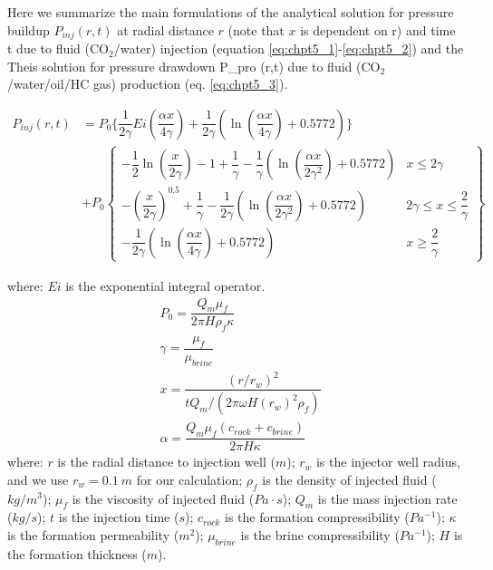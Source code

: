 Here we summarize the main formulations of the analytical solution for pressure buildup $P_{inj}(r,t)$  at radial distance $r$ (note that $x$ is dependent on r) and time t due to fluid (CO$_{2}$/water) injection  \cite[]{mathias2009approximate} (equation \ref{eq:chpt5_1}-\ref{eq:chpt5_2}) and the Theis solution for pressure drawdown P\_pro (r,t) due to fluid (CO$_{2}$/water/oil/HC gas) production (eq. \ref{eq:chpt5_3}).

\begin{equation} \label{eq:chpt5_1}
\begin{aligned}
P_{inj}(r,t) & = P_{0}\{\dfrac{1}{2\gamma}Ei(\dfrac{\alpha x}{4\gamma})+\dfrac{1}{2\gamma}(\ln(\dfrac{\alpha x}{4\gamma})+0.5772)\} \\
& + P_{0}
\left\lbrace
  \begin{array}{lr}
  -\dfrac{1}{2}\ln(\dfrac{x}{2\gamma})-1 + \dfrac{1}{\gamma} - \dfrac{1}{\gamma}(\ln(\dfrac{\alpha x}{2\gamma^2})+0.5772) & x\leq 2\gamma \\
  -(\dfrac{x}{2\gamma})^{0.5} + \dfrac{1}{\gamma} - \dfrac{1}{2\gamma}(\ln(\dfrac{\alpha x}{2\gamma^2})+0.5772) & 2\gamma \leq x\leq \dfrac{2}{\gamma} \\
  -\dfrac{1}{2\gamma}(\ln(\dfrac{\alpha x}{4\gamma})+0.5772) & x\geq \dfrac{2}{\gamma} 
  \end{array}
\right\rbrace 
\end{aligned} 
\end{equation} 

where:
$Ei$ is the exponential integral operator.
\begin{equation} \label{eq:chpt5_2}
\begin{aligned}
& P_{0} = \dfrac{Q_m\mu_f}{2\pi H \rho_{f} \kappa} \\
& \gamma = \dfrac{\mu_{f}}{\mu_{brine}} \\
& x = \dfrac{(r/r_w)^2}{tQ_m/(2\pi\omega H(r_w)^2 \rho_f)} \\
& \alpha = \dfrac{Q_m \mu_f (c_{rock}+c_{brine})}{2\pi H \kappa}
\end{aligned}
\end{equation}
where: 
$r$ is the radial distance to injection well ($m$); $r_w$ is the injector well radius, and we use $r_w = 0.1\ m$ for our calculation; $\rho_f$ is the density of injected fluid ($kg/m^3$); $\mu_f$ is the viscosity of injected fluid ($Pa\cdot s$); $Q_m$ is the mass injection rate ($kg/s$); $t$ is the injection time ($s$); $c_{rock}$ is the formation compressibility ($Pa^{-1}$); $\kappa$ is the formation permeability ($m^2$); $\mu_{brine}$ is the brine compressibility ($Pa^{-1}$); $H$ is the formation thickness ($m$). 

